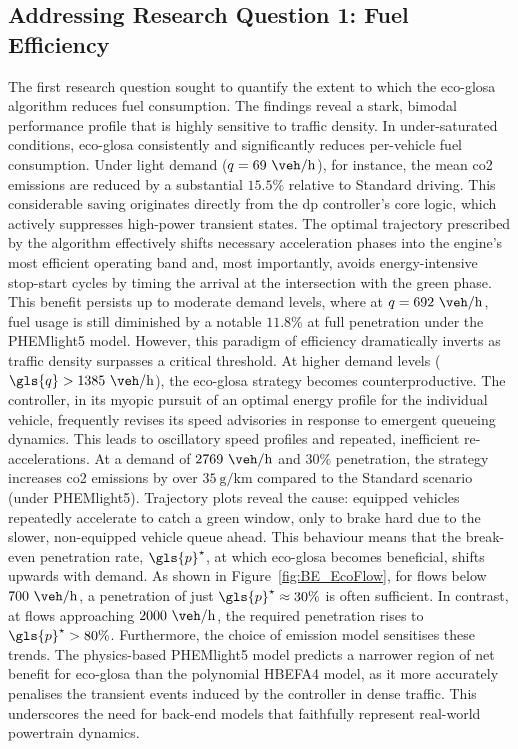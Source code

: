 \subsection*{Addressing Research Question 1: Fuel Efficiency}
The first research question sought to quantify the extent to which the \ac{eco-glosa} algorithm reduces fuel consumption. The findings reveal a stark, bimodal performance profile that is highly sensitive to traffic density.
\mynewline
In under-saturated conditions, \ac{eco-glosa} consistently and significantly reduces per-vehicle fuel consumption. Under light demand ($q=69~\unit{\veh\per\hour}$), for instance, the mean \ac{co2} emissions are reduced by a substantial $15.5\%$ relative to Standard driving. This considerable saving originates directly from the \ac{dp} controller's core logic, which actively suppresses high-power transient states. The optimal trajectory prescribed by the algorithm effectively shifts necessary acceleration phases into the engine's most efficient operating band and, most importantly, avoids energy-intensive stop-start cycles by timing the arrival at the intersection with the green phase. This benefit persists up to moderate demand levels, where at $q=692~\unit{\veh\per\hour}$, fuel usage is still diminished by a notable $11.8\%$ at full penetration under the PHEMlight5 model.
\mynewline
However, this paradigm of efficiency dramatically inverts as traffic density surpasses a critical threshold. At higher demand levels ($\gls{q} > 1385~\unit{\veh\per\hour}$), the \ac{eco-glosa} strategy becomes counterproductive. The controller, in its myopic pursuit of an optimal energy profile for the individual vehicle, frequently revises its speed advisories in response to emergent queueing dynamics. This leads to oscillatory speed profiles and repeated, inefficient re-accelerations. At a demand of $2769~\unit{\veh\per\hour}$ and $30\%$ penetration, the strategy increases \ac{co2} emissions by over $35~\unit{\gram\per\kilo\metre}$ compared to the Standard scenario (under PHEMlight5). Trajectory plots reveal the cause: equipped vehicles repeatedly accelerate to catch a green window, only to brake hard due to the slower, non-equipped vehicle queue ahead.
\mynewline
This behaviour means that the break-even penetration rate, $\gls{p}^\star$, at which \ac{eco-glosa} becomes beneficial, shifts upwards with demand. As shown in Figure~\vref{fig:BE_EcoFlow}, for flows below $700~\unit{\veh\per\hour}$, a penetration of just $\gls{p}^\star\approx30\%$ is often sufficient. In contrast, at flows approaching $2000~\unit{\veh\per\hour}$, the required penetration rises to $\gls{p}^\star > 80\%$. Furthermore, the choice of emission model sensitises these trends. The physics-based PHEMlight5 model predicts a narrower region of net benefit for \ac{eco-glosa} than the polynomial HBEFA4 model, as it more accurately penalises the transient events induced by the controller in dense traffic. This underscores the need for back-end models that faithfully represent real-world powertrain dynamics.

